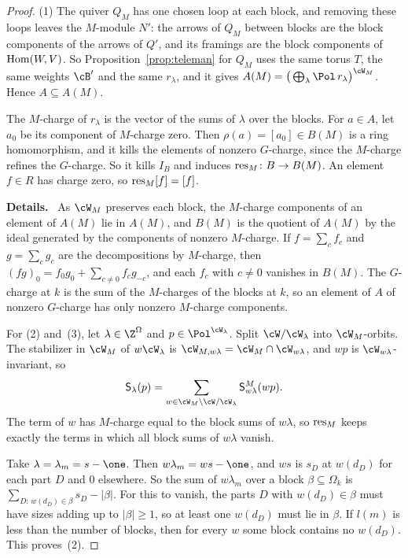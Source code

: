 \documentclass[11pt]{amsart}
\newenvironment{details}{\par\color{black!60!green}\noindent\textbf{Details.}\ }{\par}
\begin{document}
\begin{proof}
(1) The quiver $Q_M$ has one chosen loop at each block, and removing these
loops leaves the $M$-module $N'$: the arrows of $Q_M$ between blocks are the
block components of the arrows of $Q'$, and its framings are the block
components of $\operatorname{Hom}(W,V)$.  So Proposition~\ref{prop:teleman} for $Q_M$ uses
the same torus $T$, the same weights $\cB'$ and the same $r_\lambda$, and it
gives $A(M)=\big(\bigoplus_\lambda\Pol\,r_\lambda\big)^{\cW_M}$.  Hence
$A\subseteq A(M)$.

The $M$-charge of $r_\lambda$ is the vector of the sums of $\lambda$ over the
blocks.  For $a\in A$, let $a_0$ be its component of $M$-charge zero.  Then
$\rho(a)=[a_0]\in B(M)$ is a ring homomorphism, and it kills the elements of
nonzero $G$-charge, since the $M$-charge refines the $G$-charge.  So it kills
$I_B$ and induces $\operatorname{res}_M\colon B\to B(M)$.  An element $f\in R$ has charge
zero, so $\operatorname{res}_M[f]=[f]$.
\begin{details}
As $\cW_M$ preserves each block, the $M$-charge components of an
element of $A(M)$ lie in $A(M)$, and $B(M)$ is the quotient of $A(M)$ by the
ideal generated by the components of nonzero $M$-charge.  If $f=\sum_cf_c$
and $g=\sum_cg_c$ are the decompositions by $M$-charge, then
$(fg)_0=f_0g_0+\sum_{c\neq0}f_cg_{-c}$, and each $f_c$ with $c\neq0$ vanishes
in $B(M)$.  The $G$-charge at $k$ is the
sum of the $M$-charges of the blocks at $k$, so an element of $A$ of nonzero
$G$-charge has only nonzero $M$-charge components.
\end{details}

For (2) and~(3), let $\lambda\in\Z^\Omega$ and $p\in\Pol^{\cW_\lambda}$.  Split
$\cW/\cW_\lambda$ into $\cW_M$-orbits.  The stabilizer in $\cW_M$ of
$w\cW_\lambda$ is $\cW_{M,w\lambda}=\cW_M\cap\cW_{w\lambda}$, and $wp$ is
$\cW_{w\lambda}$-invariant, so
\[
 \mathsf S_\lambda(p)=\sum_{w\in\cW_M\backslash\cW/\cW_\lambda}\mathsf
 S^M_{w\lambda}(wp).
\]
The term of $w$ has $M$-charge equal to the block sums of $w\lambda$, so
$\operatorname{res}_M$ keeps exactly the terms in which all block sums of $w\lambda$
vanish.

Take $\lambda=\lambda_m=s-\one$.  Then $w\lambda_m=ws-\one$, and $ws$ is $s_D$
at $w(d_D)$ for each part $D$ and $0$ elsewhere.  So the sum of $w\lambda_m$
over a block $\beta\subseteq\Omega_k$ is
$\sum_{D:\,w(d_D)\in\beta}s_D-|\beta|$.  For this to vanish, the parts $D$ with
$w(d_D)\in\beta$ must have sizes adding up to $|\beta|\ge1$, so at least one
$w(d_D)$ must lie in $\beta$.  If $l(m)$ is less than the number of blocks,
then for every $w$ some block contains no $w(d_D)$.  This proves~(2).


\end{proof}
\end{document}
